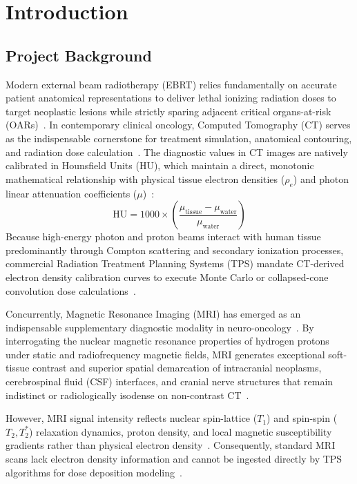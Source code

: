 \chapter{Introduction}

\section{Project Background}
Modern external beam radiotherapy (EBRT) relies fundamentally on accurate patient anatomical representations to deliver lethal ionizing radiation doses to target neoplastic lesions while strictly sparing adjacent critical organs-at-risk (OARs)~\cite{thummerer2023synthrad2023,edmund2017review}. In contemporary clinical oncology, Computed Tomography (CT) serves as the indispensable cornerstone for treatment simulation, anatomical contouring, and radiation dose calculation~\cite{edmund2017review}. The diagnostic values in CT images are natively calibrated in Hounsfield Units (HU), which maintain a direct, monotonic mathematical relationship with physical tissue electron densities ($\rho_e$) and photon linear attenuation coefficients ($\mu$)~\cite{edmund2017review,korsholm2018clinical}:
\begin{equation}
\text{HU} = 1000 \times \left( \frac{\mu_{\text{tissue}} - \mu_{\text{water}}}{\mu_{\text{water}}} \right)
\label{eq:hu_definition}
\end{equation}
Because high-energy photon and proton beams interact with human tissue predominantly through Compton scattering and secondary ionization processes, commercial Radiation Treatment Planning Systems (TPS) mandate CT-derived electron density calibration curves to execute Monte Carlo or collapsed-cone convolution dose calculations~\cite{edmund2017review,siversson2015mri}. 

Concurrently, Magnetic Resonance Imaging (MRI) has emerged as an indispensable supplementary diagnostic modality in neuro-oncology~\cite{siversson2015mri,korsholm2018clinical}. By interrogating the nuclear magnetic resonance properties of hydrogen protons under static and radiofrequency magnetic fields, MRI generates exceptional soft-tissue contrast and superior spatial demarcation of intracranial neoplasms, cerebrospinal fluid (CSF) interfaces, and cranial nerve structures that remain indistinct or radiologically isodense on non-contrast CT~\cite{siversson2015mri,thummerer2023synthrad2023}. 

However, MRI signal intensity reflects nuclear spin-lattice ($T_1$) and spin-spin ($T_2, T_2^*$) relaxation dynamics, proton density, and local magnetic susceptibility gradients rather than physical electron density~\cite{edmund2017review}. Consequently, standard MRI scans lack electron density information and cannot be ingested directly by TPS algorithms for dose deposition modeling~\cite{edmund2017review,thummerer2023synthrad2023}.

